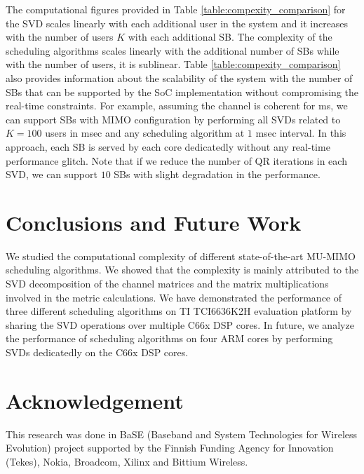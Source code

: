 \documentclass[conference,letterpaper,9pt]{./../IEEEtran}
\begin{document}
The computational figures provided in Table \ref{table:compexity_comparison} for the SVD scales linearly with each additional user in the system and it increases with the number of users $K$ with each additional SB. The complexity of the scheduling algorithms scales linearly with the additional number of SBs while with the number of users, it is sublinear. Table \ref{table:compexity_comparison} also provides information about the scalability of the system with the number of SBs that can be supported by the \ac{SoC} implementation without compromising the real-time constraints. For example, assuming the channel is coherent for  ms, we can support  SBs with  MIMO configuration by performing all SVDs related to $K = 100$ users in  msec and any scheduling algorithm at $1$ msec interval. In this approach, each SB is served by each core dedicatedly without any real-time performance glitch. Note that if we reduce the number of QR iterations in each SVD, we can support $10$ SBs with slight degradation in the performance.

\acresetall {}
\section{Conclusions and Future Work}
\label{sec:conclusion}
We studied the computational complexity of different state-of-the-art \ac{MU-MIMO} scheduling algorithms. We showed that the complexity is mainly attributed to the SVD decomposition of the channel matrices and the matrix multiplications involved in the metric calculations. We have demonstrated the performance of three different scheduling algorithms on TI TCI6636K2H evaluation platform by sharing the SVD operations over multiple C66x DSP cores. In future, we analyze the performance of scheduling algorithms on four ARM cores by performing SVDs dedicatedly on the C66x DSP cores.

\section*{Acknowledgement}
This research was done in BaSE (Baseband and System Technologies for Wireless Evolution) project supported by the Finnish Funding Agency for Innovation (Tekes), Nokia, Broadcom, Xilinx and Bittium Wireless.



%
\end{document}
